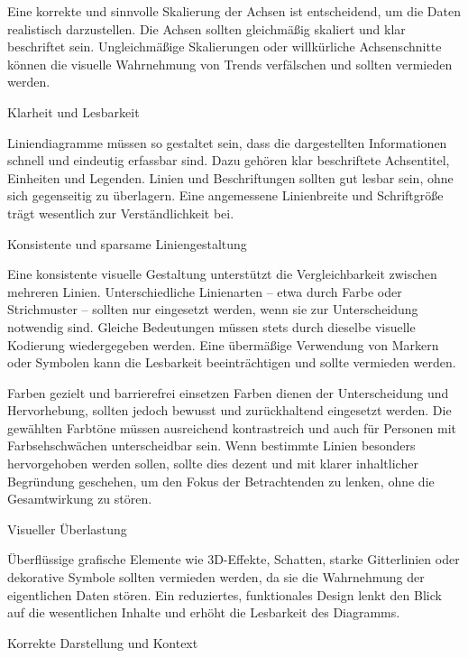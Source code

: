 Eine korrekte und sinnvolle Skalierung der Achsen ist entscheidend, um die Daten realistisch darzustellen.
Die Achsen sollten gleichmäßig skaliert und klar beschriftet sein.
Ungleichmäßige Skalierungen oder willkürliche Achsenschnitte können die visuelle Wahrnehmung von Trends verfälschen und sollten vermieden werden.

\item
Klarheit und Lesbarkeit

Liniendiagramme müssen so gestaltet sein, dass die dargestellten Informationen schnell und eindeutig erfassbar sind.
Dazu gehören klar beschriftete Achsentitel, Einheiten und Legenden.
Linien und Beschriftungen sollten gut lesbar sein, ohne sich gegenseitig zu überlagern.
Eine angemessene Linienbreite und Schriftgröße trägt wesentlich zur Verständlichkeit bei.

\item
Konsistente und sparsame Liniengestaltung

Eine konsistente visuelle Gestaltung unterstützt die Vergleichbarkeit zwischen mehreren Linien.
Unterschiedliche Linienarten – etwa durch Farbe oder Strichmuster – sollten nur eingesetzt werden, wenn sie zur Unterscheidung notwendig sind.
Gleiche Bedeutungen müssen stets durch dieselbe visuelle Kodierung wiedergegeben werden. Eine übermäßige Verwendung von Markern oder Symbolen kann die Lesbarkeit beeinträchtigen und sollte vermieden werden.

\item
Farben gezielt und barrierefrei einsetzen
Farben dienen der Unterscheidung und Hervorhebung, sollten jedoch bewusst und zurückhaltend eingesetzt werden.
Die gewählten Farbtöne müssen ausreichend kontrastreich und auch für Personen mit Farbsehschwächen unterscheidbar sein.
Wenn bestimmte Linien besonders hervorgehoben werden sollen, sollte dies dezent und mit klarer inhaltlicher Begründung geschehen, um den Fokus der Betrachtenden zu lenken, ohne die Gesamtwirkung zu stören.

\item
Visueller Überlastung

Überflüssige grafische Elemente wie 3D-Effekte, Schatten, starke Gitterlinien oder dekorative Symbole sollten vermieden werden, da sie die Wahrnehmung der eigentlichen Daten stören.
Ein reduziertes, funktionales Design lenkt den Blick auf die wesentlichen Inhalte und erhöht die Lesbarkeit des Diagramms.

\item
Korrekte Darstellung und Kontext

